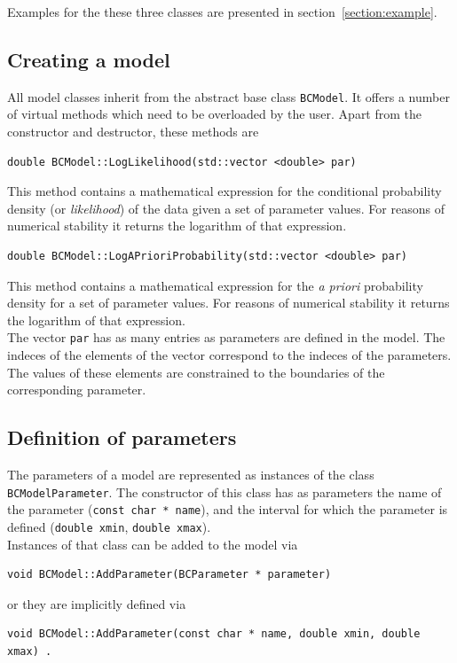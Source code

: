 \documentclass[11pt, a4paper]{article}
\begin{document}
\noindent 
Examples for the these three classes are presented in
section~\ref{section:example}. 

\subsection{Creating a model} 

All model classes inherit from the abstract base class
\verb|BCModel|. It offers a number of virtual methods which need to be
overloaded by the user. Apart from the constructor and destructor,
these methods are 
%
\begin{verbatim}
double BCModel::LogLikelihood(std::vector <double> par)
\end{verbatim}  

\noindent 
This method contains a mathematical expression for the conditional
probability density (or {\it likelihood}) of the data given a set of
parameter values. For reasons of numerical stability it returns the
logarithm of that expression. \\ 

\begin{verbatim}
double BCModel::LogAPrioriProbability(std::vector <double> par)
\end{verbatim}
%
\noindent 
This method contains a mathematical expression for the {\it a priori}
probability density for a set of parameter values. For reasons of
numerical stability it returns the logarithm of that expression. \\ 

\noindent 
The vector \verb|par| has as many entries as parameters are defined in
the model. The indeces of the elements of the vector correspond to the
indeces of the parameters. The values of these elements are
constrained to the boundaries of the corresponding parameter. 

\subsection{Definition of parameters}

The parameters of a model are represented as instances of the class
\verb|BCModelParameter|. The constructor of this class has as
parameters the name of the parameter (\verb|const char * name|), and
the interval for which the parameter is defined (\verb|double xmin|,
\verb|double xmax|). \\ 

Instances of that class can be added to the model via 
%
\begin{verbatim}
void BCModel::AddParameter(BCParameter * parameter) 
\end{verbatim}
%
\noindent 
or they are implicitly defined via 
%
\begin{verbatim}
void BCModel::AddParameter(const char * name, double xmin, double xmax) . 
\end{verbatim}
\end{document}
